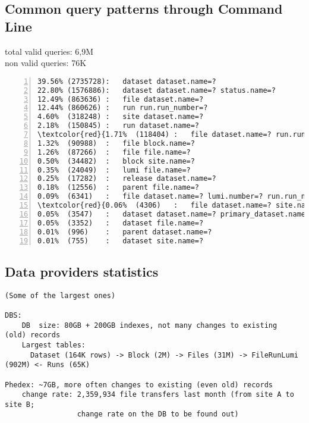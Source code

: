 \begin{appendix}
\newpage
\subsection{Common query patterns through Command Line\label{appendix_das_cli_logs}}
total valid queries: 6,9M\\
non valid queries: 76K

\begin{Verbatim}[commandchars=\\\{\},numbers=left,numbersep=4pt]
39.56% (2735728):	dataset dataset.name=?
22.80% (1576886):	dataset dataset.name=? status.name=?
12.49% (863636) :	file dataset.name=?
12.44% (860626) :	run run.run_number=?
4.60%  (318248) :	site dataset.name=?
2.18%  (150845) :	run dataset.name=?
\textcolor{red}{1.71%  (118404) :	file dataset.name=? run.run_number=?}\label{run_dataset_heavy}
1.32%  (90988)  :	file block.name=?
1.26%  (87266)  :	file file.name=?
0.50%  (34482)  :	block site.name=?
0.35%  (24049)  :	lumi file.name=?
0.25%  (17282)  :	release dataset.name=?
0.18%  (12556)  :	parent file.name=?
0.09%  (6341)   :	file dataset.name=? lumi.number=? run.run_number=?
\textcolor{red}{0.06%  (4306)   :	file dataset.name=? site.name=?}\label{site_dataset_distr_heavy}
0.05%  (3547)   :	dataset dataset.name=? primary_dataset.name=? release.name=? tier.name=?
0.05%  (3352)   :	dataset file.name=?
0.01%  (996)    :	parent dataset.name=?
0.01%  (755)    :	dataset site.name=?
\end{Verbatim}


% 
%

\end{appendix}
\begin{appendix}
\section{Data providers statistics}
{\small
\begin{verbatim}
(Some of the largest ones)

DBS:
    DB  size: 80GB + 200GB indexes, not many changes to existing  (old) records
    Largest tables: 
      Dataset (164K rows) -> Block (2M) -> Files (31M) -> FileRunLumi (902M) <- Runs (65K)

Phedex: ~7GB, more often changes to existing (even old) records
    change rate: 2,359,934 file transfers last month (from site A to site B; 
                 change rate on the DB to be found out)
\end{verbatim}
}
\end{appendix}
